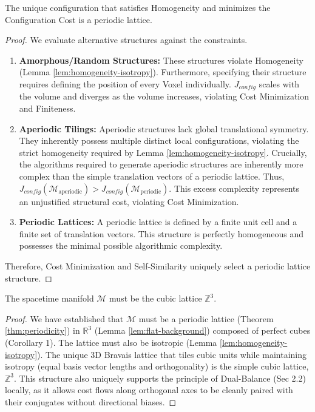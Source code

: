 \begin{theorem}\label{thm:periodicity}
The unique configuration that satisfies Homogeneity and minimizes the Configuration Cost is a periodic lattice.
\end{theorem}
\begin{proof}
We evaluate alternative structures against the constraints.

\begin{enumerate}
    \item \textbf{Amorphous/Random Structures:} These structures violate Homogeneity (Lemma \ref{lem:homogeneity-isotropy}). Furthermore, specifying their structure requires defining the position of every Voxel individually. $J_{config}$ scales with the volume and diverges as the volume increases, violating Cost Minimization and Finiteness.
    
    \item \textbf{Aperiodic Tilings:} Aperiodic structures lack global translational symmetry. They inherently possess multiple distinct local configurations, violating the strict homogeneity required by Lemma \ref{lem:homogeneity-isotropy}. Crucially, the algorithms required to generate aperiodic structures are inherently more complex than the simple translation vectors of a periodic lattice. Thus, $J_{config}(\mathcal{M}_{\text{aperiodic}}) > J_{config}(\mathcal{M}_{\text{periodic}})$. This excess complexity represents an unjustified structural cost, violating Cost Minimization.
    
    \item \textbf{Periodic Lattices:} A periodic lattice is defined by a finite unit cell and a finite set of translation vectors. This structure is perfectly homogeneous and possesses the minimal possible algorithmic complexity.
\end{enumerate}
Therefore, Cost Minimization and Self-Similarity uniquely select a periodic lattice structure.
\end{proof}

\begin{theorem}
The spacetime manifold $\mathcal{M}$ must be the cubic lattice $\mathbb{Z}^3$.
\end{theorem}
\begin{proof}
We have established that $\mathcal{M}$ must be a periodic lattice (Theorem \ref{thm:periodicity}) in $\mathbb{R}^3$ (Lemma \ref{lem:flat-background}) composed of perfect cubes (Corollary 1). The lattice must also be isotropic (Lemma \ref{lem:homogeneity-isotropy}). The unique 3D Bravais lattice that tiles cubic units while maintaining isotropy (equal basis vector lengths and orthogonality) is the simple cubic lattice, $\mathbb{Z}^3$. This structure also uniquely supports the principle of Dual-Balance (Sec 2.2) locally, as it allows cost flows along orthogonal axes to be cleanly paired with their conjugates without directional biases.
\end{proof}

